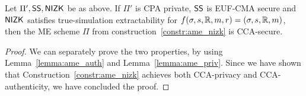 \begin{theorem}\label{theo:ame_nizk}
    Let $\Pi', \mathsf{SS}, \mathsf{NIZK}$ be as above.
    If $\Pi'$ is CPA private, $\mathsf{SS}$ is EUF-CMA secure and $\mathsf{NIZK}$ satisfies true-simulation extractability for $f(\sigma, s, \mathbb{R}, m, r) = (\sigma, s, \mathbb{R}, m)$, then the ME scheme $\Pi$ from construction~\ref{constr:ame_nizk} is CCA-secure.
\end{theorem}

\begin{proof}
    We can separately prove the two properties, by using Lemma~\ref{lemma:ame_auth} and Lemma~\ref{lemma:ame_priv}.
    Since we have shown that Construction~\ref{constr:ame_nizk} achieves both CCA-privacy and CCA-authenticity, we have concluded the proof.
\end{proof}